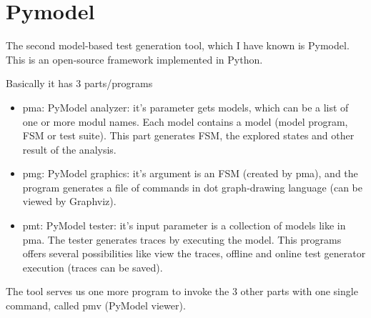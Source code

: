 \section{Pymodel} \label{mbt:tools:pymodel}

The second model-based test generation tool, which I have known is Pymodel. This is an open-source framework implemented in Python. 

Basically it has 3 parts/programs
\begin{itemize}
	\item pma: PyModel analyzer: it's parameter gets models, which can be a list of one or more modul names.  Each model contains a model (model program, FSM or test suite). This part generates FSM, the explored states and other result of the analysis.
	\item pmg: PyModel graphics: it's argument is an FSM (created by pma), and the program generates a file of commands in dot graph-drawing language (can be viewed by Graphviz). 
	\item pmt: PyModel tester: it's input parameter is a collection of models like in pma. The tester generates traces by executing the model. This programs offers several possibilities like view the traces, offline and online test generator execution (traces can be saved). 
\end{itemize}

The tool serves us one more program to invoke the 3 other parts with one single command, called pmv (PyModel viewer).


